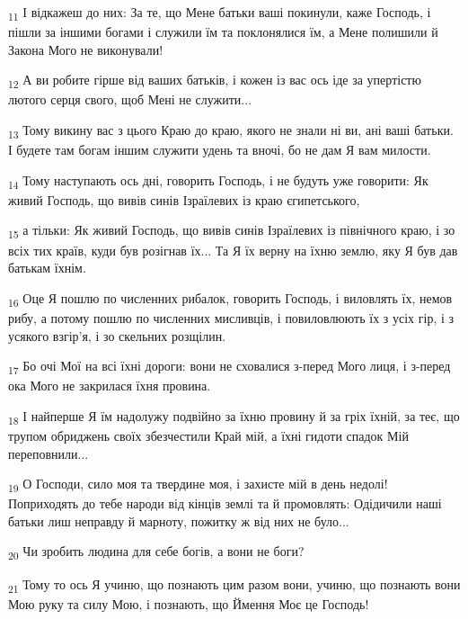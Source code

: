 \begin{tcolorbox}
\textsubscript{11} І відкажеш до них: За те, що Мене батьки ваші покинули, каже Господь, і пішли за іншими богами і служили їм та поклонялися їм, а Мене полишили й Закона Мого не виконували!
\end{tcolorbox}
\begin{tcolorbox}
\textsubscript{12} А ви робите гірше від ваших батьків, і кожен із вас ось іде за упертістю лютого серця свого, щоб Мені не служити...
\end{tcolorbox}
\begin{tcolorbox}
\textsubscript{13} Тому викину вас з цього Краю до краю, якого не знали ні ви, ані ваші батьки. І будете там богам іншим служити удень та вночі, бо не дам Я вам милости.
\end{tcolorbox}
\begin{tcolorbox}
\textsubscript{14} Тому наступають ось дні, говорить Господь, і не будуть уже говорити: Як живий Господь, що вивів синів Ізраїлевих із краю єгипетського,
\end{tcolorbox}
\begin{tcolorbox}
\textsubscript{15} а тільки: Як живий Господь, що вивів синів Ізраїлевих із північного краю, і зо всіх тих країв, куди був розігнав їх... Та Я їх верну на їхню землю, яку Я був дав батькам їхнім.
\end{tcolorbox}
\begin{tcolorbox}
\textsubscript{16} Оце Я пошлю по численних рибалок, говорить Господь, і виловлять їх, немов рибу, а потому пошлю по численних мисливців, і повиловлюють їх з усіх гір, і з усякого взгір'я, і зо скельних розщілин.
\end{tcolorbox}
\begin{tcolorbox}
\textsubscript{17} Бо очі Мої на всі їхні дороги: вони не сховалися з-перед Мого лиця, і з-перед ока Мого не закрилася їхня провина.
\end{tcolorbox}
\begin{tcolorbox}
\textsubscript{18} І найперше Я їм надолужу подвійно за їхню провину й за гріх їхній, за теє, що трупом обриджень своїх збезчестили Край мій, а їхні гидоти спадок Мій переповнили...
\end{tcolorbox}
\begin{tcolorbox}
\textsubscript{19} О Господи, сило моя та твердине моя, і захисте мій в день недолі! Поприходять до тебе народи від кінців землі та й промовлять: Одідичили наші батьки лиш неправду й марноту, пожитку ж від них не було...
\end{tcolorbox}
\begin{tcolorbox}
\textsubscript{20} Чи зробить людина для себе богів, а вони не боги?
\end{tcolorbox}
\begin{tcolorbox}
\textsubscript{21} Тому то ось Я учиню, що познають цим разом вони, учиню, що познають вони Мою руку та силу Мою, і познають, що Ймення Моє це Господь!
\end{tcolorbox}
